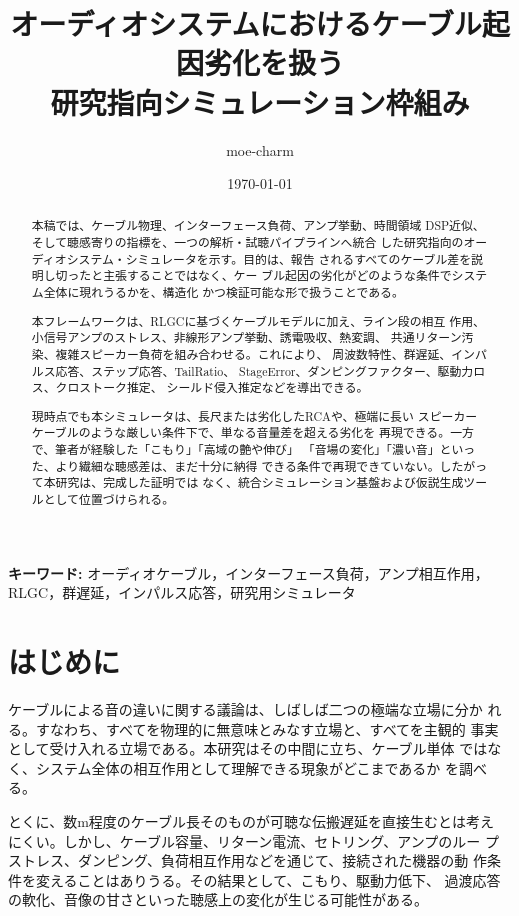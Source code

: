 \documentclass[a4paper,11pt]{ltjsarticle}
\title{オーディオシステムにおけるケーブル起因劣化を扱う\\研究指向シミュレーション枠組み}
\author{moe-charm}
\date{\today}
\begin{document}
\maketitle

\begin{abstract}
本稿では、ケーブル物理、インターフェース負荷、アンプ挙動、時間領域
DSP近似、そして聴感寄りの指標を、一つの解析・試聴パイプラインへ統合
した研究指向のオーディオシステム・シミュレータを示す。目的は、報告
されるすべてのケーブル差を説明し切ったと主張することではなく、ケー
ブル起因の劣化がどのような条件でシステム全体に現れうるかを、構造化
かつ検証可能な形で扱うことである。

本フレームワークは、RLGCに基づくケーブルモデルに加え、ライン段の相互
作用、小信号アンプのストレス、非線形アンプ挙動、誘電吸収、熱変調、
共通リターン汚染、複雑スピーカー負荷を組み合わせる。これにより、
周波数特性、群遅延、インパルス応答、ステップ応答、TailRatio、
StageError、ダンピングファクター、駆動力ロス、クロストーク推定、
シールド侵入推定などを導出できる。

現時点でも本シミュレータは、長尺または劣化したRCAや、極端に長い
スピーカーケーブルのような厳しい条件下で、単なる音量差を超える劣化を
再現できる。一方で、筆者が経験した「こもり」「高域の艶や伸び」
「音場の変化」「濃い音」といった、より繊細な聴感差は、まだ十分に納得
できる条件で再現できていない。したがって本研究は、完成した証明では
なく、統合シミュレーション基盤および仮説生成ツールとして位置づけられる。
\end{abstract}

\textbf{キーワード:} オーディオケーブル，インターフェース負荷，アンプ相互作用，
RLGC，群遅延，インパルス応答，研究用シミュレータ

\section{はじめに}

ケーブルによる音の違いに関する議論は、しばしば二つの極端な立場に分か
れる。すなわち、すべてを物理的に無意味とみなす立場と、すべてを主観的
事実として受け入れる立場である。本研究はその中間に立ち、ケーブル単体
ではなく、システム全体の相互作用として理解できる現象がどこまであるか
を調べる。

とくに、数m程度のケーブル長そのものが可聴な伝搬遅延を直接生むとは考え
にくい。しかし、ケーブル容量、リターン電流、セトリング、アンプのルー
プストレス、ダンピング、負荷相互作用などを通じて、接続された機器の動
作条件を変えることはありうる。その結果として、こもり、駆動力低下、
過渡応答の軟化、音像の甘さといった聴感上の変化が生じる可能性がある。
\end{document}
